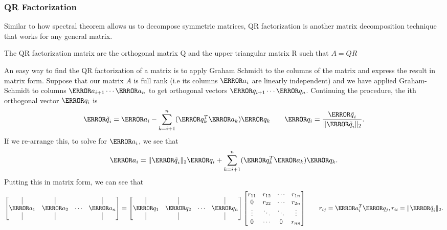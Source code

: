 \subsubsection{QR Factorization}
Similar to how spectral theorem allows us to decompose symmetric matrices, QR factorization is another matrix decomposition technique that works for any general matrix.
\begin{definition}
  The QR factorization matrix are the orthogonal matrix Q and the upper triangular matrix R such that $A = QR$
  \label{defn:qr-factorization}
\end{definition}
An easy way to find the QR factorization of a matrix is to apply Graham Schmidt to the columns of the matrix and express the result in matrix form.
Suppose that our matrix $A$ is full rank (i.e its columns $\V{a}_i$ are linearly independent) and we have applied Graham-Schmidt to columns $\V{a}_{i+1}\cdots\V{a}_n$ to get orthogonal vectors $\V{q}_{i+1}\cdots\V{q}_{n}$.
Continuing the procedure, the ith orthogonal vector $\V{q}_i$ is
\[
  \V{\tilde{q}}_i = \V{a}_i - \sum_{k=i+1}^{n} (\V{q}_k^T \V{a}_k)\V{q}_k \qquad \V{q}_i = \frac{\V{\tilde{q}}_i}{\|\V{\tilde{q}}_i\|_2}.
\]
If we re-arrange this, to solve for $\V{a}_i$, we see that
\[
  \V{a}_i = \|\V{\tilde{q}}_i\|_2 \V{q}_i + \sum_{k=i+1}^{n} (\V{q}_k^T \V{a}_k)\V{q}_k.
\]
Putting this in matrix form, we can see that
\[
  \begin{bmatrix}
	\vrule & \vrule & & \vrule \\
	\V{a}_1 & \V{a}_2 & \cdots & \V{a}_{n}\\
	\vrule & \vrule & & \vrule 
  \end{bmatrix} = \begin{bmatrix}
	\vrule & \vrule & & \vrule \\
	\V{q}_1 & \V{q}_2 & \cdots & \V{q}_{n}\\
	\vrule & \vrule & & \vrule 
  \end{bmatrix} \begin{bmatrix}
	r_{11} & r_{12} & \cdots & r_{1n}\\
	0 & r_{22} & \cdots & r_{2n}\\
	\vdots & \ddots & \ddots & \vdots\\
	0 & \cdots & 0 & r_{nn}
  \end{bmatrix} \qquad r_{ij} = \V{a}_i^T\V{q_j}, r_{ii} = \|\V{\tilde{q}}_i\|_2.
\]

